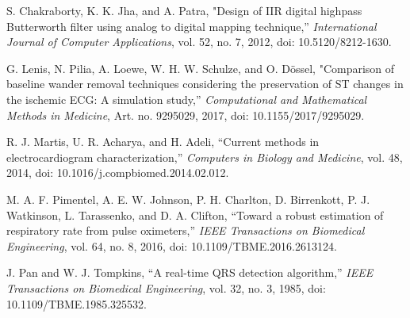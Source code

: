 \documentclass{citask}
\begin{document}
\begin{thebibliography}{1}
S. Chakraborty, K. K. Jha, and A. Patra, "Design of IIR digital highpass Butterworth filter using analog to digital mapping technique,” \emph{International Journal of Computer Applications}, vol. 52, no. 7, 2012, doi: 10.5120/8212-1630.

G. Lenis, N. Pilia, A. Loewe, W. H. W. Schulze, and O. Dössel, "Comparison of baseline wander removal techniques considering the preservation of ST changes in the ischemic ECG: A simulation study,” \emph{Computational and Mathematical Methods in Medicine}, Art. no. 9295029, 2017, doi: 10.1155/2017/9295029.

R. J. Martis, U. R. Acharya, and H. Adeli, “Current methods in electrocardiogram characterization,” \emph{Computers in Biology and Medicine}, vol. 48, 2014, doi: 10.1016/j.compbiomed.2014.02.012.

M. A. F. Pimentel, A. E. W. Johnson, P. H. Charlton, D. Birrenkott, P. J. Watkinson, L. Tarassenko, and D. A. Clifton, “Toward a robust estimation of respiratory rate from pulse oximeters,” \emph{IEEE Transactions on Biomedical Engineering}, vol. 64, no. 8, 2016, doi: 10.1109/TBME.2016.2613124.

J. Pan and W. J. Tompkins, “A real-time QRS detection algorithm,” \emph{IEEE Transactions on Biomedical Engineering}, vol. 32, no. 3, 1985, doi: 10.1109/TBME.1985.325532.
\end{thebibliography}
\end{document}
